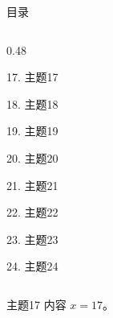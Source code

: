 \documentclass[aspectratio=169,10pt,fontset=fandol]{ctexbeamer}
\begin{document}
\begin{frame}[t,fragile]{目录}
\begin{columns}[T,onlytextwidth]
\begin{column}{0.48\textwidth}
{\color{blue}\small 17. 主题17\par}\vspace{0.22em}
{\color{gray!40}\small 18. 主题18\par}\vspace{0.22em}
{\color{gray!40}\small 19. 主题19\par}\vspace{0.22em}
{\color{gray!40}\small 20. 主题20\par}\vspace{0.22em}
{\color{gray!40}\small 21. 主题21\par}\vspace{0.22em}
{\color{gray!40}\small 22. 主题22\par}\vspace{0.22em}
{\color{gray!40}\small 23. 主题23\par}\vspace{0.22em}
{\color{gray!40}\small 24. 主题24\par}\vspace{0.22em}
\end{column}
\end{columns}
\end{frame}
\begin{frame}[t,fragile]{主题17}
\normalsize
{\normalsize
内容 $x=17$。
}
\end{frame}
\end{document}
